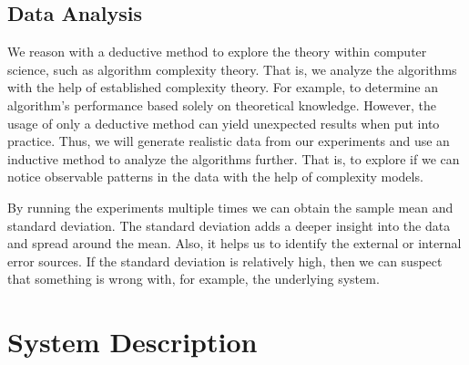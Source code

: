\documentclass[a4paper,11pt]{kth-mag}
\newcommand*{\skippara}{\par\vspace{\baselineskip} \noindent}
\begin{document}
\subsection{Data Analysis}
We reason with a deductive method to explore the theory within computer science, such as algorithm complexity theory.
That is, we analyze the algorithms with the help of established complexity theory.
For example, to determine an algorithm's performance based solely on theoretical knowledge.
However, the usage of only a deductive method can yield unexpected results when put into practice.
Thus, we will generate realistic data from our experiments and use an inductive method to analyze the algorithms further.
That is, to explore if we can notice observable patterns in the data with the help of complexity models.

\skippara By running the experiments multiple times we can obtain the sample mean and standard deviation.
The standard deviation adds a deeper insight into the data and spread around the mean.
Also, it helps us to identify the external or internal error sources.
If the standard deviation is relatively high, then we can suspect that something is wrong with, for example, the underlying system.


\clearpage


\section{System Description}\label{section:system}


\end{document}
